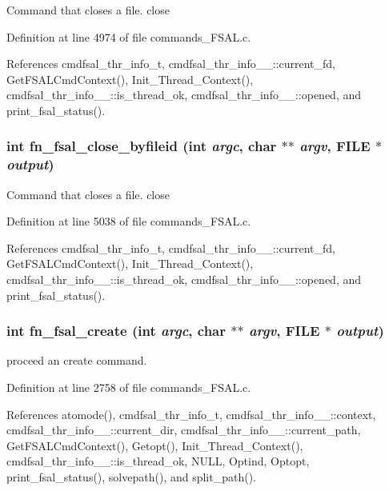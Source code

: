 Command that closes a file. close 

Definition at line 4974 of file commands\_\-FSAL.c.

References cmdfsal\_\-thr\_\-info\_\-t, cmdfsal\_\-thr\_\-info\_\-\_\-::current\_\-fd, Get\-FSALCmd\-Context(), Init\_\-Thread\_\-Context(), cmdfsal\_\-thr\_\-info\_\-\_\-::is\_\-thread\_\-ok, cmdfsal\_\-thr\_\-info\_\-\_\-::opened, and print\_\-fsal\_\-status().
\subsubsection{\setlength{\rightskip}{0pt plus 5cm}int fn\_\-fsal\_\-close\_\-byfileid (int {\em argc}, char $\ast$$\ast$ {\em argv}, FILE $\ast$ {\em output})}\label{commands_8h_a28}


Command that closes a file. close 

Definition at line 5038 of file commands\_\-FSAL.c.

References cmdfsal\_\-thr\_\-info\_\-t, cmdfsal\_\-thr\_\-info\_\-\_\-::current\_\-fd, Get\-FSALCmd\-Context(), Init\_\-Thread\_\-Context(), cmdfsal\_\-thr\_\-info\_\-\_\-::is\_\-thread\_\-ok, cmdfsal\_\-thr\_\-info\_\-\_\-::opened, and print\_\-fsal\_\-status().
\subsubsection{\setlength{\rightskip}{0pt plus 5cm}int fn\_\-fsal\_\-create (int {\em argc}, char $\ast$$\ast$ {\em argv}, FILE $\ast$ {\em output})}\label{commands_8h_a18}


proceed an create command. 

Definition at line 2758 of file commands\_\-FSAL.c.

References atomode(), cmdfsal\_\-thr\_\-info\_\-t, cmdfsal\_\-thr\_\-info\_\-\_\-::context, cmdfsal\_\-thr\_\-info\_\-\_\-::current\_\-dir, cmdfsal\_\-thr\_\-info\_\-\_\-::current\_\-path, Get\-FSALCmd\-Context(), Getopt(), Init\_\-Thread\_\-Context(), cmdfsal\_\-thr\_\-info\_\-\_\-::is\_\-thread\_\-ok, NULL, Optind, Optopt, print\_\-fsal\_\-status(), solvepath(), and split\_\-path().
